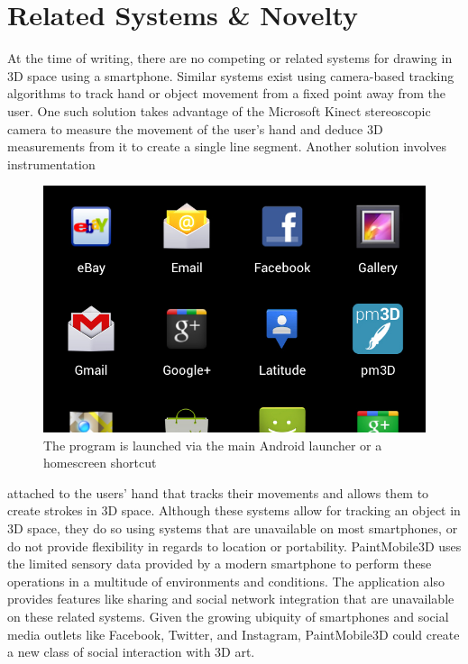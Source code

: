 \documentclass{chi-ext}
\begin{document}
\section{Related Systems \& Novelty}

At the time of writing, there are no competing or related systems for drawing
in 3D space using a smartphone. Similar systems exist using camera-based
tracking algorithms to track hand or object movement from a fixed point away
from the user. One such solution takes advantage of the Microsoft Kinect
stereoscopic camera to measure the movement of the user’s hand and deduce 3D
measurements from it to create a single line segment. Another solution
involves instrumentation 

\begin{figure}
\parbox{\columnwidth}{
  \centering
  \includegraphics[width=\columnwidth]{icon.jpg}
  \caption{The program is launched via the main Android launcher or a homescreen shortcut}
  \label{fig:icon}
}
\end{figure}

\pagebreak

attached to the users' hand that tracks their
movements and allows them to create strokes in 3D space\cite{schkolne2002drawing}. 
Although these systems allow for tracking an
object in 3D space, they do so using systems that are unavailable on most
smartphones, or do not provide flexibility in regards to location or
portability. PaintMobile3D uses the limited sensory data provided by a modern
smartphone to perform these operations in a multitude of environments and
conditions. The application also provides features like sharing and social
network integration that are unavailable on these related systems. Given the
growing ubiquity of smartphones and social media outlets like Facebook,
Twitter, and Instagram, PaintMobile3D could create a new class of social
interaction with 3D art.
\end{document}
